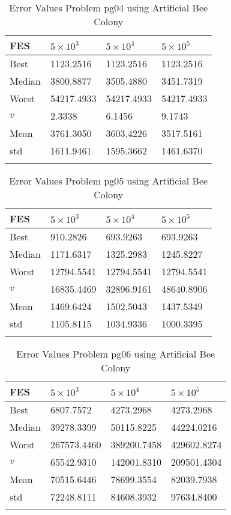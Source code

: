 \documentclass[10pt, a4paper]{book}
\begin{document}
\begin{center}
\begin{longtable}{l l l l}
FES & $5 \times 10^{3}$ & $5 \times 10^{4}$ & $5 \times 10^{5}$ \\
\hline
Best & 1123.2516 & 1123.2516 & 1123.2516 \\
Median & 3800.8877 & 3505.4880 & 3451.7319 \\
Worst & 54217.4933 & 54217.4933 & 54217.4933 \\
$v$ & 2.3338 & 6.1456 & 9.1743 \\
Mean & 3761.3050 & 3603.4226 & 3517.5161 \\
std & 1611.9461 & 1595.3662 & 1461.6370 \\
\caption{ Error Values Problem pg04 using Artificial Bee Colony }
\end{longtable}
\end{center}

\begin{center}
\begin{longtable}{l l l l}
FES & $5 \times 10^{3}$ & $5 \times 10^{4}$ & $5 \times 10^{5}$ \\
\hline
Best & 910.2826 & 693.9263 & 693.9263 \\
Median & 1171.6317 & 1325.2983 & 1245.8227 \\
Worst & 12794.5541 & 12794.5541 & 12794.5541 \\
$v$ & 16835.4469 & 32896.9161 & 48640.8906 \\
Mean & 1469.6424 & 1502.5043 & 1437.5349 \\
std & 1105.8115 & 1034.9336 & 1000.3395 \\
\caption{ Error Values Problem pg05 using Artificial Bee Colony }
\end{longtable}
\end{center}

\begin{center}
\begin{longtable}{l l l l}
FES & $5 \times 10^{3}$ & $5 \times 10^{4}$ & $5 \times 10^{5}$ \\
\hline
Best & 6807.7572 & 4273.2968 & 4273.2968 \\
Median & 39278.3399 & 50115.8225 & 44224.0216 \\
Worst & 267573.4460 & 389200.7458 & 429602.8274 \\
$v$ & 65542.9310 & 142001.8310 & 209501.4304 \\
Mean & 70515.6446 & 78699.3554 & 82039.7938 \\
std & 72248.8111 & 84608.3932 & 97634.8400 \\
\caption{ Error Values Problem pg06 using Artificial Bee Colony }
\end{longtable}
\end{center}
\end{document}
